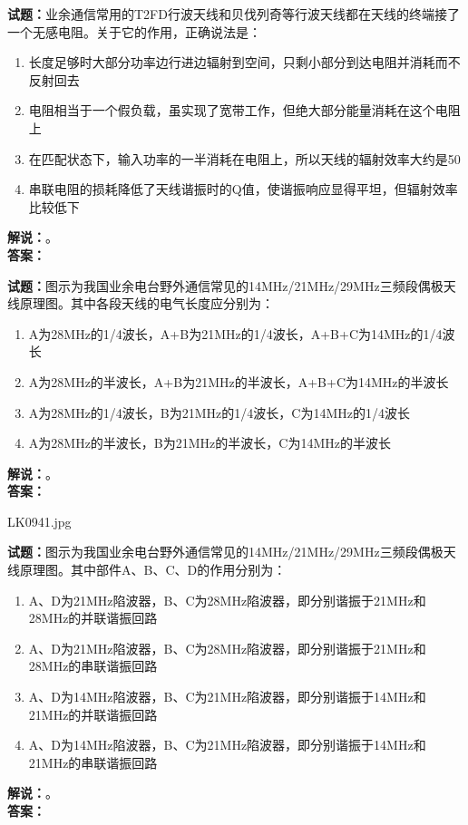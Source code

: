 \documentclass{ctexbook}
\begin{document}
\vspace{\baselineskip}

\noindent\textbf{试题：}业余通信常用的T2FD行波天线和贝伐列奇等行波天线都在天线的终端接了一个无感电阻。关于它的作用，正确说法是：
\begin{enumerate}[leftmargin=3em]
  \item 长度足够时大部分功率边行进边辐射到空间，只剩小部分到达电阻并消耗而不反射回去
  \item 电阻相当于一个假负载，虽实现了宽带工作，但绝大部分能量消耗在这个电阻上
  \item 在匹配状态下，输入功率的一半消耗在电阻上，所以天线的辐射效率大约是50%
  \item 串联电阻的损耗降低了天线谐振时的Q值，使谐振响应显得平坦，但辐射效率比较低下
\end{enumerate}
\noindent\textbf{解说：}\textbf{}。\\\noindent\textbf{答案：}

\vspace{\baselineskip}

\noindent\textbf{试题：}图示为我国业余电台野外通信常见的14\unit{\MHz}/21\unit{\MHz}/29\unit{\MHz}三频段偶极天线原理图。其中各段天线的电气长度应分别为：
\begin{enumerate}[leftmargin=3em]
  \item A为28\unit{\MHz}的1/4波长，A+B为21\unit{\MHz}的1/4波长，A+B+C为14\unit{\MHz}的1/4波长
  \item A为28\unit{\MHz}的半波长，A+B为21\unit{\MHz}的半波长，A+B+C为14\unit{\MHz}的半波长
  \item A为28\unit{\MHz}的1/4波长，B为21\unit{\MHz}的1/4波长，C为14\unit{\MHz}的1/4波长
  \item A为28\unit{\MHz}的半波长，B为21\unit{\MHz}的半波长，C为14\unit{\MHz}的半波长
\end{enumerate}
\noindent\textbf{解说：}\textbf{}。\\\noindent\textbf{答案：}

\vspace{\baselineskip}

LK0941.jpg

\noindent\textbf{试题：}图示为我国业余电台野外通信常见的14\unit{\MHz}/21\unit{\MHz}/29\unit{\MHz}三频段偶极天线原理图。其中部件A、B、C、D的作用分别为：
\begin{enumerate}[leftmargin=3em]
  \item A、D为21\unit{\MHz}陷波器，B、C为28\unit{\MHz}陷波器，即分别谐振于21\unit{\MHz}和28\unit{\MHz}的并联谐振回路
  \item A、D为21\unit{\MHz}陷波器，B、C为28\unit{\MHz}陷波器，即分别谐振于21\unit{\MHz}和28\unit{\MHz}的串联谐振回路
  \item A、D为14\unit{\MHz}陷波器，B、C为21\unit{\MHz}陷波器，即分别谐振于14\unit{\MHz}和21\unit{\MHz}的并联谐振回路
  \item A、D为14\unit{\MHz}陷波器，B、C为21\unit{\MHz}陷波器，即分别谐振于14\unit{\MHz}和21\unit{\MHz}的串联谐振回路
\end{enumerate}
\noindent\textbf{解说：}\textbf{}。\\\noindent\textbf{答案：}
\end{document}
